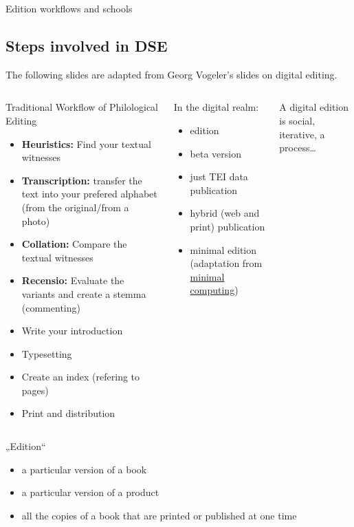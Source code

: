 \begin{frame}[allowframebreaks]{Edition workflows and schools}
\subsection{Steps involved in DSE}

{\scriptsize
The following slides are adapted from Georg Vogeler's slides on digital editing.
}
\footnotesize
\begin{columns}
\begin{block}{Traditional Workflow of Philological Editing}
\begin{itemize}
    \item \textbf{Heuristics:} Find your textual witnesses
    \item \textbf{Transcription:} transfer the text into your prefered alphabet (from the original/from a photo)
    \item \textbf{Collation:} Compare the textual witnesses
    \item \textbf{Recensio:} Evaluate the variants and create a stemma (commenting)
    \item Write your introduction
    \item Typesetting
    \item Create an index (refering to pages)
    \item Print and distribution
\end{itemize}
\end{block}

\begin{block}{In the digital realm:}
\begin{itemize}
    \item edition 
    \item beta version
    \item just TEI data publication
    \item hybrid (web and print) publication
    \item minimal edition (adaptation from \href{https://go-dh.github.io/mincomp/about}{minimal computing})
\end{itemize}
\end{block}

\alert{A digital edition is social, iterative, a process\dots }
\end{columns}

\framebreak


\begin{columns}
\begin{block}{„Edition“}
\begin{itemize}
\item  a particular version of a book
\item  a particular version of a product
\item  all the copies of a book that are printed or published at one time
\end{itemize}
\end{block}


\end{columns}
\end{frame}
